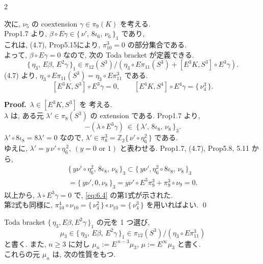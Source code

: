 \documentclass[10pt, leqno]{ltjsarticle}
\newcommand{\todai}[2][]{\{\,#2\,\}_{#1}}      %
\newcommand{\gen}[1]{\{\,#1\,\}}       %
\newcommand{\pit}[2]{\pi_{#1}^{#2}}
\numberwithin{equation}{section}
\theoremstyle{plain}
\theoremstyle{definition}
\theoremstyle{remark}
\begin{document}
\begin{paracol}{2}

次に, \(\nu_{5}\) の coextension  \(\gamma\in\pi_{9}(K)\) を考える. \\
Prop1.7 より,
\(\beta\circ E\gamma\in 
\todai[1]{\nu',\,8\iota_{6},\,\nu_{6}}\) 
であり, \\
これは, (4.7), Prop5.15により, 
\(\pit{10}{3} = 0\) の部分集合である. \\
よって, \(\beta\circ E\gamma=0\) なので, 次の Toda bracket が定義できる. 
\[
\todai[1]{\eta_{3},\,E\beta,\,E^{2}\gamma}
\in \pi_{12}(S^{3}) / (\eta_{3}\circ E\pi_{11}(S^{3}) + [E^{3}K, S^{3}]\circ E^{3}\gamma) .
\]
(4.7) より,
\(\eta_{3}\circ E\pi_{11}(S^{3})=\eta_{3}\circ E\pi^{3}_{11}\) である. 
\begin{equation}\label{eq:6.4}
[E^{3}K, S^{3}] \circ E^{3}\gamma = 0,
\qquad
[E^{4}K, S^{4}] \circ E^{4}\gamma = \gen{\nu^{3}_{4}}.
\end{equation}

\noindent
\textbf{Proof.}\
\(\lambda\in [E^{3}K, S^{3}]\) を 考える. \\
\(\lambda\) は, ある元
\(\lambda'\in \pi_{8}(S^{3})\) の extension である. 
Prop1.7 より,
\[
-(\lambda\circ E^{3}\gamma)\ \in\ \todai[3]{\lambda',\,8\iota_{8},\,\nu_{8}}.
\]
\(\lambda'\circ 8\iota_{8}=8\lambda'=0\) なので, 
\(\lambda'\in \pi^{3}_{8} = \mathbb{Z}_2\gen{\nu'\circ\eta_6^2}\) である. \\
ゆえに, 
\(\lambda'
=y\,\nu' \circ \eta_6^{\,2},\ (y=0 \text{ or } 1) \) 
と表わせる. 
Prop1.7, (4.7), Prop5.8, 5.11 から,
\[
\begin{align*}
  \todai[3]{y\nu'\circ \eta_{6}^{2},\,8\iota_{8},\,\nu_{8}}
  \subset \todai[3]{y\nu', \eta_6^2\circ 8\iota_{8},\,\nu_{8}}\\
  = \todai[3]{y\nu', 0, \nu_8} 
  = y\nu'\circ E^3\pit{9}{3} + \pit{9}{3}\circ\nu_9 = 0 .
\end{align*}
\]
以上から, 
\(\lambda\circ E^{3}\gamma=0\) で, \eqref{eq:6.4} の第1式が示された. \\
第2式も同様に, 
\(\pit{10}{4}\circ \nu_{10} = \gen{\nu^{2}_{4}}\circ \nu_{10}
= \gen{\nu^{3}_{4}}\)
を用いればよい.
\qed

Toda bracket \(\todai[1]{\eta_{3},E\beta,E^{2}\gamma}\) 
の元を 1 つ選び, 
\[
\mu_{3}\in \todai[1]{\eta_{3},\,E\beta,\,E^{2}\gamma}
\in \pi_{12}(S^{3}) / (\eta_{3}\circ E\pi^{3}_{11})
\]
と書く. 
また, \(n\ge3\) に対し \(\mu_{n}:=E^{\,n-3}\mu_{3}\), 
\(\mu:=E^{\infty}\mu_{3}\) と書く. \\
これらの元 \(\mu_n\) は, 次の性質をもつ. 


\end{paracol}
\end{document}
